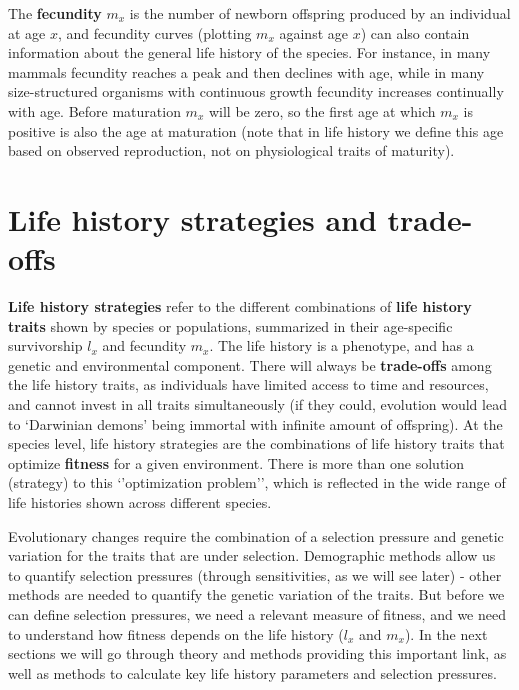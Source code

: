\documentclass[
]{book}
\begin{document}
The \textbf{fecundity} \(m_x\) is the number of newborn offspring produced by an individual at age \(x\), and fecundity curves (plotting \(m_x\) against age \(x\)) can also contain information about the general life history of the species. For instance, in many mammals fecundity reaches a peak and then declines with age, while in many size-structured organisms with continuous growth fecundity increases continually with age. Before maturation \(m_x\) will be zero, so the first age at which \(m_x\) is positive is also the age at maturation (note that in life history we define this age based on observed reproduction, not on physiological traits of maturity).

\hypertarget{life-history-strategies-and-trade-offs}{%
\section{Life history strategies and trade-offs}\label{life-history-strategies-and-trade-offs}}

\textbf{Life history strategies} refer to the different combinations of \textbf{life history traits} shown by species or populations, summarized in their age-specific survivorship \(l_x\) and fecundity \(m_x\). The life history is a phenotype, and has a genetic and environmental component. There will always be \textbf{trade-offs} among the life history traits, as individuals have limited access to time and resources, and cannot invest in all traits simultaneously (if they could, evolution would lead to `Darwinian demons' being immortal with infinite amount of offspring). At the species level, life history strategies are the combinations of life history traits that optimize \textbf{fitness} for a given environment. There is more than one solution (strategy) to this `'optimization problem'', which is reflected in the wide range of life histories shown across different species.

Evolutionary changes require the combination of a selection pressure and genetic variation for the traits that are under selection. Demographic methods allow us to quantify selection pressures (through sensitivities, as we will see later) - other methods are needed to quantify the genetic variation of the traits. But before we can define selection pressures, we need a relevant measure of fitness, and we need to understand how fitness depends on the life history (\(l_x\) and \(m_x\)). In the next sections we will go through theory and methods providing this important link, as well as methods to calculate key life history parameters and selection pressures.
\end{document}
